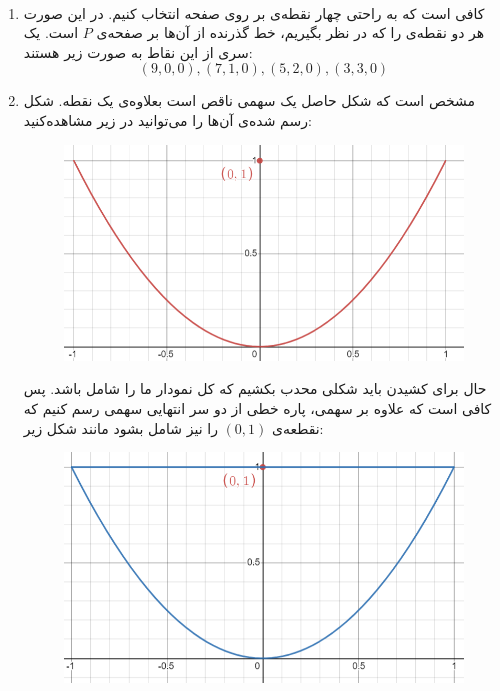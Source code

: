 \\
\begin{enumerate}[wide, labelwidth=!, labelindent=0pt]
    \item کافی است که به راحتی چهار نقطه‌ی بر روی صفحه انتخاب کنیم. در این صورت هر دو نقطه‌ی را که در نظر
بگیریم، خط گذرنده از آن‌ها بر صفحه‌ی
$P$ است. یک سری از این نقاط به صورت زیر هستند:
\begin{equation*}
    (9, 0, 0), (7, 1, 0), (5, 2, 0), (3, 3, 0)
\end{equation*}
    \item مشخص است که شکل حاصل یک سهمی ناقص است بعلاوه‌ی یک نقطه. شکل رسم شده‌ی آن‌ها را می‌توانید در زیر مشاهده‌کنید:
\begin{figure}[H]
    \centerline{\includegraphics[scale=.3]{source/1-2-1.png}}
\end{figure}
\noindent
حال برای کشیدن
باید شکلی محدب بکشیم که کل نمودار ما را شامل باشد. پس کافی است که علاوه بر سهمی، پاره خطی از
دو سر انتهایی سهمی رسم کنیم که نقطعه‌ی
$(0,1)$
را نیز شامل بشود مانند شکل زیر:
\begin{figure}[H]
    \centerline{\includegraphics[scale=.3]{source/1-2-2.png}}

\end{figure}
\end{enumerate}
